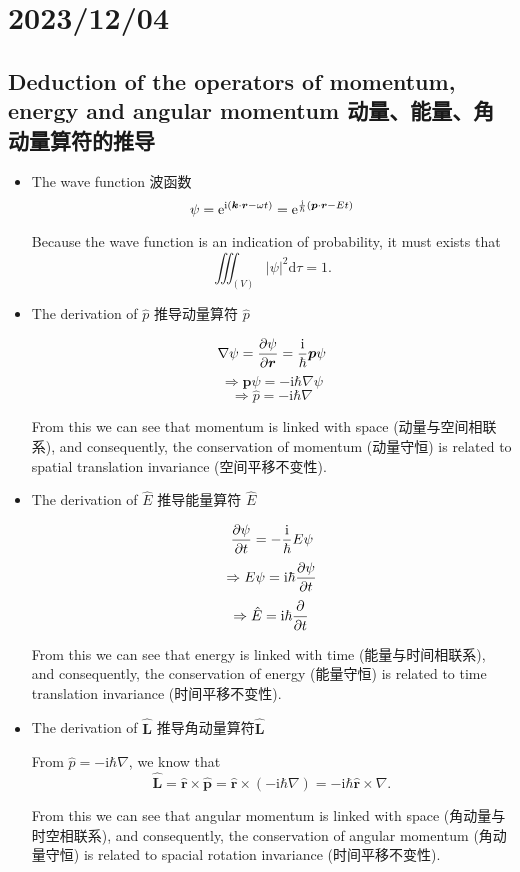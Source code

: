\chapter{2023/12/04}\label{20231204}

\section{Deduction of the operators of momentum, energy and angular
momentum
动量、能量、角动量算符的推导}\label{deduction-of-the-operators-of-momentum-energy-and-angular-momentum-ux52a8ux91cfux80fdux91cfux89d2ux52a8ux91cfux7b97ux7b26ux7684ux63a8ux5bfc}

\begin{itemize}
\tightlist{}
\item
  The wave function 波函数
  \[\psi = \mathrm e^{\mathrm i(\boldsymbol k \cdot \boldsymbol r - \omega t)} = \mathrm e^{\mathrm {i \over \hbar}(\boldsymbol p \cdot \boldsymbol r - E t)}\]

  Because the wave function is an indication of probability, it must
  exists that \[\iiint _{(V)} |\psi|^2 \mathrm d\tau=1.\]
\item
  The derivation of \(\hat p\) 推导动量算符 \(\hat p\)

  \[\nabla \psi = {\partial \psi \over \partial \boldsymbol r} = {\mathrm i \over \hbar}\boldsymbol p \psi\] \[\Rightarrow \boldsymbol p \psi = -\mathrm i \hbar \nabla \psi\] \[\Rightarrow \hat p = -\mathrm i \hbar \nabla\]

  From this we can see that momentum is linked with space
  (动量与空间相联系), and consequently, the conservation of momentum
  (动量守恒) is related to spatial translation invariance
  (空间平移不变性).
\item
  The derivation of \(\hat E\) 推导能量算符 \(\hat E\)

  \[{\partial \psi \over \partial t} = -{\mathrm i \over \hbar}E \psi\] \[\Rightarrow E \psi = \mathrm i \hbar {\partial \psi \over \partial t}\] \[\Rightarrow \hat E = \mathrm i \hbar {\partial \over \partial t}\]

  From this we can see that energy is linked with time
  (能量与时间相联系), and consequently, the conservation of energy
  (能量守恒) is related to time translation invariance (时间平移不变性).
\item
  The derivation of \(\hat{\boldsymbol{L}}\)
  推导角动量算符\(\hat{\boldsymbol{L}}\)

  From \(\hat p = -\mathrm i \hbar \nabla\), we know that
  \[\hat{\boldsymbol{L}} = \hat{\boldsymbol{r}} \times \hat{\boldsymbol{p}} = \hat{\boldsymbol{r}} \times \left( -\mathrm i \hbar \nabla \right) = -\mathrm i \hbar \hat{\boldsymbol{r}} \times \nabla.\]

  From this we can see that angular momentum is linked with space
  (角动量与时空相联系), and consequently, the conservation of angular
  momentum (角动量守恒) is related to spacial rotation invariance
  (时间平移不变性).
\end{itemize}


